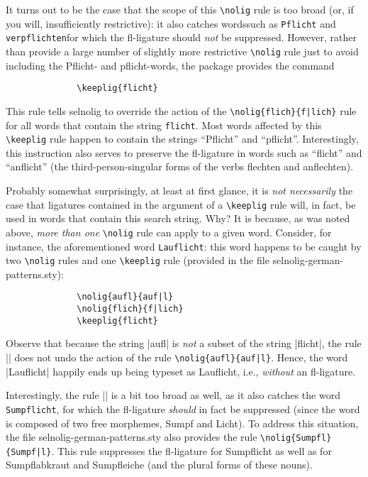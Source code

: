 \documentclass[11pt]{article}
\newcommand{\pkg}[1]{\textsf{#1}}
\newcommand{\opt}[1]{\texttt{#1}}
\newcommand{\cmmd}[1]{\texttt{\textbackslash #1}}
\begin{document}
It turns out to be the case that the scope of this \cmmd{nolig} rule is too broad (or, if you will, insufficiently restrictive): it also catches words\textemdash such as \opt{Pflicht} and \opt{verpflichten}\textemdash for which the fl-ligature should \emph{not} be suppressed. However, rather than provide a large number of slightly more restrictive \cmmd{nolig} rule just to avoid including the Pflicht- and pflicht-words, the package provides the command
\begin{Verbatim}
              \keeplig{flicht}
\end{Verbatim}
This rule tells \pkg{selnolig} to override the action of the \Verb+\nolig{flich}{f|lich}+ rule for all words that contain the string \opt{flicht}. Most words affected by this \cmmd{keeplig} rule happen to contain the strings \enquote{Pflicht} and \enquote{pflicht}. Interestingly, this instruction also serves to preserve the fl-ligature in words such as \enquote{flicht} and \enquote{anflicht} (the third-person-singular forms of the verbs flechten and anflechten). 

Probably somewhat surprisingly, at least at first glance, it is \emph{not necessarily} the case that ligatures contained in the argument of a \cmmd{keeplig} rule will, in fact, be used in words that contain this search string. Why? It is because, as was noted above, \emph{more than one} \cmmd{nolig} rule can apply to a given word. Consider, for instance, the aforementioned word \opt{Lauflicht}: this word happens to be caught by two \cmmd{nolig} rules and one \cmmd{keeplig} rule (provided in the file \pkg{selnolig-german-patterns.sty}):
\begin{Verbatim}
              \nolig{aufl}{auf|l}
              \nolig{flich}{f|lich}
              \keeplig{flicht}
\end{Verbatim}
Observe that because the string |aufl| is \emph{not} a subset of the string |flicht|, the rule || does not undo the action of the rule \Verb+\nolig{aufl}{auf|l}+. Hence, the word |Lauflicht| happily ends up being typeset as Lauflicht, i.e., \emph{without} an fl-ligature. 

Interestingly, the rule || is a bit too broad as well, as it also catches the word \opt{Sumpf\-licht}, for which the fl-ligature \emph{should} in fact be suppressed (since the word is composed of two free morphemes, Sumpf and Licht). To address this situation, the file \pkg{selnolig-german-patterns.sty} also provides the rule \Verb+\nolig{Sumpfl}{Sumpf|l}+. This rule suppresses the fl-ligature for Sumpflicht as well as for Sumpflabkraut and Sumpfleiche (and the plural forms of these nouns).
\end{document}
